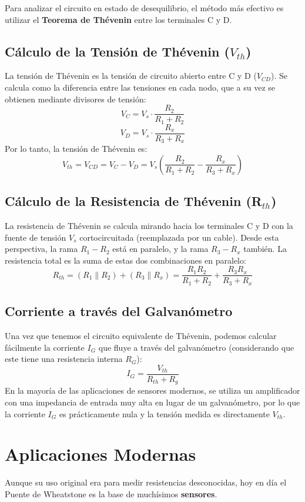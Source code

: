 \documentclass[12pt,a4paper]{article}
\begin{document}
Para analizar el circuito en estado de desequilibrio, el método más efectivo es utilizar el \textbf{Teorema de Thévenin} entre los terminales C y D.

\subsection{Cálculo de la Tensión de Thévenin ($V_{th}$)}
La tensión de Thévenin es la tensión de circuito abierto entre C y D ($V_{CD}$). Se calcula como la diferencia entre las tensiones en cada nodo, que a su vez se obtienen mediante divisores de tensión:
\[
V_C = V_s \cdot \frac{R_2}{R_1 + R_2}
\]
\[
V_D = V_s \cdot \frac{R_x}{R_3 + R_x}
\]
Por lo tanto, la tensión de Thévenin es:
\[
V_{th} = V_{CD} = V_C - V_D = V_s \left( \frac{R_2}{R_1 + R_2} - \frac{R_x}{R_3 + R_x} \right)
\]

\subsection{Cálculo de la Resistencia de Thévenin (R$_{th}$)}
La resistencia de Thévenin se calcula mirando hacia los terminales C y D con la fuente de tensión $V_s$ cortocircuitada (reemplazada por un cable). Desde esta perspectiva, la rama $R_1-R_2$ está en paralelo, y la rama $R_3-R_x$ también. La resistencia total es la suma de estas dos combinaciones en paralelo:
\[
R_{th} = (R_1 \parallel R_2) + (R_3 \parallel R_x) = \frac{R_1 R_2}{R_1 + R_2} + \frac{R_3 R_x}{R_3 + R_x}
\]

\subsection{Corriente a través del Galvanómetro}
Una vez que tenemos el circuito equivalente de Thévenin, podemos calcular fácilmente la corriente $I_G$ que fluye a través del galvanómetro (considerando que este tiene una resistencia interna $R_G$):
\[
I_G = \frac{V_{th}}{R_{th} + R_g}
\]
En la mayoría de las aplicaciones de sensores modernos, se utiliza un amplificador con una impedancia de entrada muy alta en lugar de un galvanómetro, por lo que la corriente $I_G$ es prácticamente nula y la tensión medida es directamente $V_{th}$.


\section{Aplicaciones Modernas}

Aunque su uso original era para medir resistencias desconocidas, hoy en día el Puente de Wheatstone es la base de muchísimos \textbf{sensores}.
\end{document}
